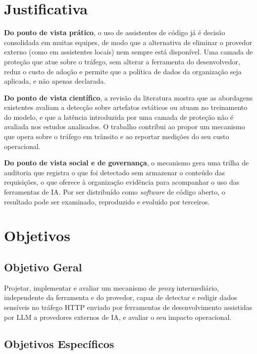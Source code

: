 \section{Justificativa}

\textbf{Do ponto de vista prático}, o uso de assistentes de código já é decisão consolidada em muitas equipes, de modo que a alternativa de eliminar o provedor externo (como em assistentes locais) nem sempre está disponível. Uma camada de proteção que atue sobre o tráfego, sem alterar a ferramenta do desenvolvedor, reduz o custo de adoção e permite que a política de dados da organização seja aplicada, e não apenas declarada.

\textbf{Do ponto de vista científico}, a revisão da literatura mostra que as abordagens existentes avaliam a detecção sobre artefatos estáticos ou atuam no treinamento do modelo, e que a latência introduzida por uma camada de proteção não é avaliada nos estudos analisados. O trabalho contribui ao propor um mecanismo que opera sobre o tráfego em trânsito e ao reportar medições do seu custo operacional.

\textbf{Do ponto de vista social e de governança}, o mecanismo gera uma trilha de auditoria que registra o que foi detectado sem armazenar o conteúdo das requisições, o que oferece à organização evidência para acompanhar o uso das ferramentas de IA. Por ser distribuído como \textit{software} de código aberto, o resultado pode ser examinado, reproduzido e evoluído por terceiros.

\section{Objetivos}
\label{sec:intro_obj}

\subsection{Objetivo Geral}

Projetar, implementar e avaliar um mecanismo de \textit{proxy} intermediário, independente da ferramenta e do provedor, capaz de detectar e redigir dados sensíveis no tráfego HTTP enviado por ferramentas de desenvolvimento assistidas por LLM a provedores externos de IA, e avaliar o seu impacto operacional.

\subsection{Objetivos Específicos}


